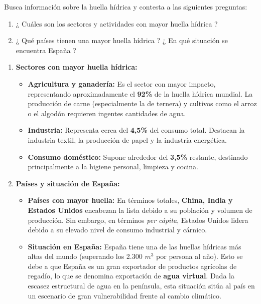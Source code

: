 {
	Busca información sobre la huella hídrica y contesta a las siguientes preguntas:
	\begin{enumerate}[label=\textbf{\alph*)}]
		\item ¿ Cuáles son los sectores y actividades con mayor huella hídrica ?
		\item ¿ Qué países tienen una mayor huella hídrica ? ¿ En qué situación se encuentra España ?
	\end{enumerate}
}

\begin{solution}
	\begin{enumerate}[label=\textbf{\alph*)}]
		\item \textbf{Sectores con mayor huella hídrica:}
		      \begin{itemize}
			      \item \textbf{Agricultura y ganadería:} Es el sector con mayor impacto, representando aproximadamente el \textbf{92\%} de la huella hídrica mundial. La producción de carne (especialmente la de ternera) y cultivos como el arroz o el algodón requieren ingentes cantidades de agua.
			      \item \textbf{Industria:} Representa cerca del \textbf{4,5\%} del consumo total. Destacan la industria textil, la producción de papel y la industria energética.
			      \item \textbf{Consumo doméstico:} Supone alrededor del \textbf{3,5\%} restante, destinado principalmente a la higiene personal, limpieza y cocina.
		      \end{itemize}

		\item \textbf{Países y situación de España:}
		      \begin{itemize}
			      \item \textbf{Países con mayor huella:} En términos totales, \textbf{China, India y Estados Unidos} encabezan la lista debido a su población y volumen de producción. Sin embargo, en términos \textit{per cápita}, Estados Unidos lidera debido a su elevado nivel de consumo industrial y cárnico.
			      \item \textbf{Situación en España:} España tiene una de las huellas hídricas más altas del mundo (superando los 2.300 $m^3$ por persona al año). Esto se debe a que España es un gran exportador de productos agrícolas de regadío, lo que se denomina exportación de \textbf{agua virtual}. Dada la escasez estructural de agua en la península, esta situación sitúa al país en un escenario de gran vulnerabilidad frente al cambio climático.
		      \end{itemize}
	\end{enumerate}
\end{solution}

